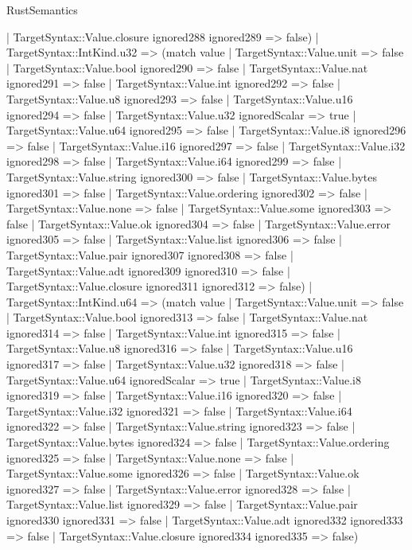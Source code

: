 \begin{lexlean}{RustSemantics}
\begin{semanticmodule}
{      | TargetSyntax::Value.closure ignored288 ignored289 => false)
    | TargetSyntax::IntKind.u32 => (match value
      | TargetSyntax::Value.unit => false
      | TargetSyntax::Value.bool ignored290 => false
      | TargetSyntax::Value.nat ignored291 => false
      | TargetSyntax::Value.int ignored292 => false
      | TargetSyntax::Value.u8 ignored293 => false
      | TargetSyntax::Value.u16 ignored294 => false
      | TargetSyntax::Value.u32 ignoredScalar => true
      | TargetSyntax::Value.u64 ignored295 => false
      | TargetSyntax::Value.i8 ignored296 => false
      | TargetSyntax::Value.i16 ignored297 => false
      | TargetSyntax::Value.i32 ignored298 => false
      | TargetSyntax::Value.i64 ignored299 => false
      | TargetSyntax::Value.string ignored300 => false
      | TargetSyntax::Value.bytes ignored301 => false
      | TargetSyntax::Value.ordering ignored302 => false
      | TargetSyntax::Value.none => false
      | TargetSyntax::Value.some ignored303 => false
      | TargetSyntax::Value.ok ignored304 => false
      | TargetSyntax::Value.error ignored305 => false
      | TargetSyntax::Value.list ignored306 => false
      | TargetSyntax::Value.pair ignored307 ignored308 => false
      | TargetSyntax::Value.adt ignored309 ignored310 => false
      | TargetSyntax::Value.closure ignored311 ignored312 => false)
    | TargetSyntax::IntKind.u64 => (match value
      | TargetSyntax::Value.unit => false
      | TargetSyntax::Value.bool ignored313 => false
      | TargetSyntax::Value.nat ignored314 => false
      | TargetSyntax::Value.int ignored315 => false
      | TargetSyntax::Value.u8 ignored316 => false
      | TargetSyntax::Value.u16 ignored317 => false
      | TargetSyntax::Value.u32 ignored318 => false
      | TargetSyntax::Value.u64 ignoredScalar => true
      | TargetSyntax::Value.i8 ignored319 => false
      | TargetSyntax::Value.i16 ignored320 => false
      | TargetSyntax::Value.i32 ignored321 => false
      | TargetSyntax::Value.i64 ignored322 => false
      | TargetSyntax::Value.string ignored323 => false
      | TargetSyntax::Value.bytes ignored324 => false
      | TargetSyntax::Value.ordering ignored325 => false
      | TargetSyntax::Value.none => false
      | TargetSyntax::Value.some ignored326 => false
      | TargetSyntax::Value.ok ignored327 => false
      | TargetSyntax::Value.error ignored328 => false
      | TargetSyntax::Value.list ignored329 => false
      | TargetSyntax::Value.pair ignored330 ignored331 => false
      | TargetSyntax::Value.adt ignored332 ignored333 => false
      | TargetSyntax::Value.closure ignored334 ignored335 => false)
}
\end{semanticmodule}
\end{lexlean}
